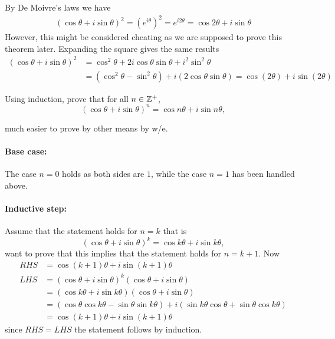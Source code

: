 \documentclass[a4paper, english, 12pt]{article} %
\begin{document}
\begin{answer}
  By De Moivre's laws we have
  \begin{align*}
    (\cos \theta + i \sin \theta)^2
    = (e^{i \theta})^2
    = e^{i 2 \theta}
    = \cos 2 \theta + i \sin \theta
  \end{align*}
  However, this might be considered cheating as we are supposed to prove this
  theorem later. Expanding the square gives the same results
  \begin{align*}
    (\cos \theta + i \sin \theta)^2
    & = \cos^2 \theta + 2 i \cos \theta \sin \theta + i^2 \sin^2 \theta \\
    & = (\cos^2 \theta - \sin^2 \theta) + i (2 \cos \theta \sin \theta)
    = \cos (2 \theta) + i \sin (2 \theta)
  \end{align*}
\end{answer}

\begin{subproblem}
  Using induction, prove that for all $n \in \mathbb{Z}^+$,
  \begin{equation*}
    (\cos \theta + i \sin \theta)^n = \cos n\theta + i \sin n\theta,
  \end{equation*}
\end{subproblem}

\begin{answer}
much easier to prove by other means by w/e. \paragraph{Base case:} The case
  $n=0$ holds as both sides are $1$, while the case $n=1$ has been handled
  above.

  \paragraph{Inductive step:} Assume that the statement holds for $n=k$ that is
  \begin{equation*}
    (\cos \theta + i \sin \theta)^k = \cos k\theta + i \sin k\theta,
  \end{equation*}
  want to prove that this implies that the statement holds for $n=k+1$. Now
  \begin{align*}
    RHS & = \cos (k+1)\theta + i \sin (k+1) \theta \\
    LHS & = (\cos \theta + i \sin \theta)^{k} (\cos \theta + i \sin \theta) \\
        & = (\cos k \theta + i \sin k \theta) (\cos \theta + i \sin \theta) \\
        & = (\cos \theta \cos k \theta - \sin \theta \sin k \theta )+
          i (\sin k \theta \cos \theta + \sin \theta \cos k \theta ) \\
        & = \cos(k+1)\theta + i \sin(k+1) \theta
  \end{align*}
  since $RHS=LHS$ the statement follows by induction.
\end{answer}
\end{document}
